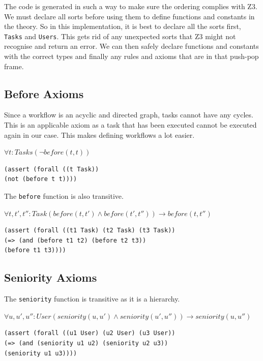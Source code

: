 \documentclass[a4paper]{report}
\begin{document}
The code is generated in such a way to make sure the ordering complies with Z3. We must declare all sorts before using them to define functions and constants in the theory. So in this implementation, it is best to declare all the sorts first, \texttt{Tasks} and \texttt{Users}. This gets rid of any unexpected sorts that Z3 might not recognise and return an error. We can then safely declare functions and constants with the correct types and finally any rules and axioms that are in that push-pop frame.\\

\subsection{Before Axioms}
Since a workflow is an acyclic and directed graph, tasks cannot have any cycles. This is an applicable axiom as a task that has been executed cannot be executed again in our case. This makes defining workflows a lot easier. 
\begin{center}
$\forall t : Tasks (\neg before(t, t))$
\end{center}
\begin{lstlisting}[frame=single]
(assert (forall ((t Task))
(not (before t t))))
\end{lstlisting}

The \texttt{before} function is also transitive. 

\begin{center}
$\forall t, t\ensuremath{'}, t\ensuremath{''}  : Task (before(t, t\ensuremath{'}) \wedge before(t\ensuremath{'}, t\ensuremath{''})) \longrightarrow before(t, t\ensuremath{''})$
\end{center}

\begin{lstlisting}[frame=single]
(assert (forall ((t1 Task) (t2 Task) (t3 Task))
(=> (and (before t1 t2) (before t2 t3))
(before t1 t3))))
\end{lstlisting}

\subsection{Seniority Axioms}
The \texttt{seniority} function is transitive as it is a hierarchy.\\
\begin{center}
$\forall u, u\ensuremath{'}, u\ensuremath{''}  : User (seniority(u, u\ensuremath{'}) \wedge seniority(u\ensuremath{'}, u\ensuremath{''})) \longrightarrow seniority(u, u\ensuremath{''})$
\end{center}
\begin{lstlisting}[frame=single]
(assert (forall ((u1 User) (u2 User) (u3 User)) 
(=> (and (seniority u1 u2) (seniority u2 u3)) 
(seniority u1 u3))))
\end{lstlisting} 
\end{document}
